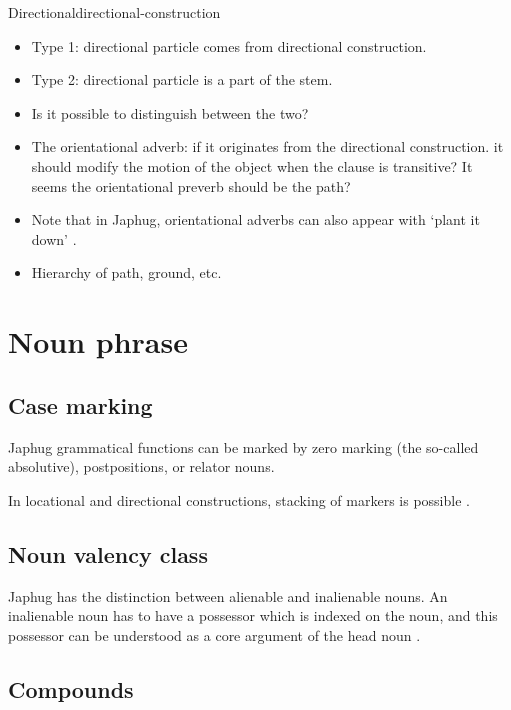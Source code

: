 \documentclass[a4paper, oneside, 12pt]{report}
\newcommand*{\citepage}[1]{p.~{#1}}
\newcommand{\translate}[1]{`#1'}
\begin{document}
\begin{todobox}{Directional}{directional-construction}
    \begin{itemize}
        \item Type 1: directional particle comes from directional construction.
        \item Type 2: directional particle is a part of the stem.
        \item Is it possible to distinguish between the two?
        
        \item The orientational adverb: if it originates from the directional construction.
        it should modify the motion of the object when the clause is transitive?
        It seems the orientational preverb should be the path?
        \item Note that in Japhug, orientational adverbs can also appear with \translate{plant it down}
        \citep[\citepage{1211}, (85)]{jacques2021grammar}.
        \item Hierarchy of path, ground, etc.
    \end{itemize}
\end{todobox}

\section{Noun phrase}

\subsection{Case marking}

Japhug grammatical functions can be marked by zero marking (the so-called absolutive),
postpositions, or relator nouns.

In locational and directional constructions,
stacking of markers is possible
\citep[\citepage{831}, (20); \citepage{361}, (1)]{jacques2021grammar}.

\subsection{Noun valency class}
Japhug has the distinction between alienable and inalienable nouns.
An inalienable noun has to have a possessor
which is indexed on the noun,
and this possessor can be understood as a core argument of the head noun
\citep[\citepage{116}]{jacques2021grammar}.

\subsection{Compounds} 
\end{document}
